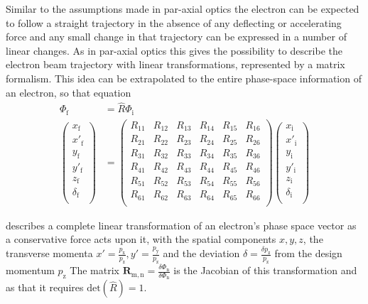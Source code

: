 Similar to the assumptions made in par-axial optics the electron can be expected to 
follow a straight trajectory in the absence of any deflecting or accelerating force and any small change in that trajectory 
can be expressed in a number of linear changes. 
As in par-axial optics this gives the possibility to describe the electron beam trajectory with linear transformations, represented by a matrix formalism.
This idea can be extrapolated to the entire phase-space information of an electron, so that equation
\begin{equation}
\label{eqn:R_Matrix}
\begin{split}
\Phi_\mathrm{f}&=\hat{R} \Phi_\mathrm{i} \\
\begin{pmatrix}
x_\mathrm{f}\\
x'_\mathrm{f}\\
y_\mathrm{f}\\
y'_\mathrm{f}\\
z_\mathrm{f}\\
\delta_\mathrm{f}\\
\end{pmatrix}
&=
\begin{pmatrix}
R_{11}&R_{12}&R_{13}&R_{14}&R_{15}&R_{16}\\
R_{21}&R_{22}&R_{23}&R_{24}&R_{25}&R_{26}\\
R_{31}&R_{32}&R_{33}&R_{34}&R_{35}&R_{36}\\
R_{41}&R_{42}&R_{43}&R_{44}&R_{45}&R_{46}\\
R_{51}&R_{52}&R_{53}&R_{54}&R_{55}&R_{56}\\
R_{61}&R_{62}&R_{63}&R_{64}&R_{65}&R_{66}\\
\end{pmatrix}
\begin{pmatrix}
x_\mathrm{i}\\
x'_\mathrm{i}\\
y_\mathrm{i}\\
y'_\mathrm{i}\\
z_\mathrm{i}\\
\delta_\mathrm{i}\\
\end{pmatrix}
\end{split}
\end{equation}

describes a complete linear transformation of an electron's phase space vector as a conservative force acts upon it, with the spatial components $x,y,z$, the transverse momenta $x'=\frac{p_\mathrm{x}}{p_\mathrm{z}},y'=\frac{p_\mathrm{y}}{p_\mathrm{z}}$ and the deviation  $\delta=\frac{\delta p_\mathrm{z}}{p_\mathrm{z}}$ from the design momentum $p_\mathrm{z}$
The matrix $\mathbf{R}_\mathrm{m,n}= \frac{\delta \Phi_\mathrm{n}}{\delta \Phi_\mathrm{n}}$ is the Jacobian of this transformation and as that it requires $\mathrm{det}(\hat{R})=1$.


